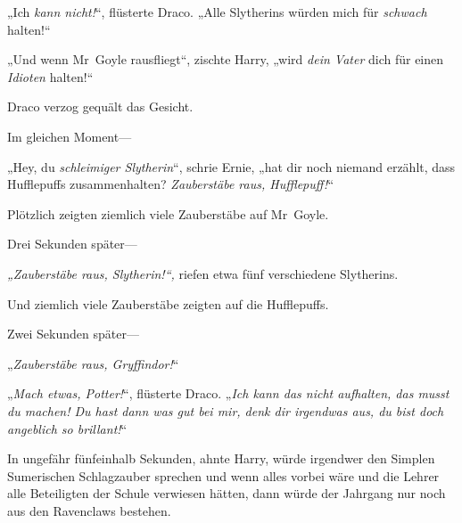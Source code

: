 „Ich \emph{kann nicht!}“, flüsterte Draco. „Alle Slytherins würden mich für \emph{schwach} halten!“

„Und wenn Mr~Goyle rausfliegt“, zischte Harry, „wird \emph{dein Vater} dich für einen \emph{Idioten} halten!“

Draco verzog gequält das Gesicht.

Im gleichen Moment—

„Hey, du \emph{schleimiger Slytherin}“, schrie Ernie, „hat dir noch niemand erzählt, dass Hufflepuffs zusammenhalten? \emph{Zauberstäbe raus, Hufflepuff!}“

Plötzlich zeigten ziemlich viele Zauberstäbe auf Mr~Goyle.

Drei Sekunden später—

\emph{„Zauberstäbe raus, Slytherin!“,} riefen etwa fünf verschiedene Slytherins.

Und ziemlich viele Zauberstäbe zeigten auf die Hufflepuffs.

Zwei Sekunden später—

„\emph{Zauberstäbe raus, Gryffindor!}“

„\emph{Mach etwas, Potter!}“, flüsterte Draco. „\emph{Ich kann das nicht aufhalten, das musst du machen! Du hast dann was gut bei mir, denk dir irgendwas aus, du bist doch angeblich so brillant!}“

In ungefähr fünfeinhalb Sekunden, ahnte Harry, würde irgendwer den Simplen Sumerischen Schlagzauber sprechen und wenn alles vorbei wäre und die Lehrer alle Beteiligten der Schule verwiesen hätten, dann würde der Jahrgang nur noch aus den Ravenclaws bestehen.

